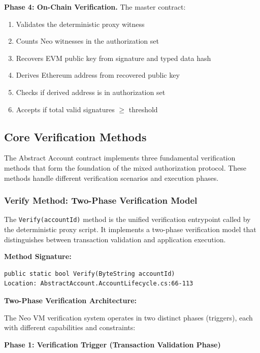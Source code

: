 \documentclass[10pt,twocolumn]{article}
\newcommand{\code}[1]{\texttt{\small #1}}
\begin{document}
{\textbf{Phase 4: On-Chain Verification.} The master contract:
\begin{enumerate}[leftmargin=*,topsep=2pt,itemsep=1pt]
\item Validates the deterministic proxy witness
\item Counts Neo witnesses in the authorization set
\item Recovers EVM public key from signature and typed data hash
\item Derives Ethereum address from recovered public key
\item Checks if derived address is in authorization set
\item Accepts if total valid signatures $\geq$ threshold
\end{enumerate}



\subsection{Core Verification Methods}

The Abstract Account contract implements three fundamental verification methods that form the foundation of the mixed authorization protocol. These methods handle different verification scenarios and execution phases.

\subsubsection{Verify Method: Two-Phase Verification Model}

The \code{Verify(accountId)} method is the unified verification entrypoint called by the deterministic proxy script. It implements a two-phase verification model that distinguishes between transaction validation and application execution.

\textbf{Method Signature:}
\begin{small}
\begin{verbatim}
public static bool Verify(ByteString accountId)
Location: AbstractAccount.AccountLifecycle.cs:66-113
\end{verbatim}
\end{small}

\textbf{Two-Phase Verification Architecture:}

The Neo VM verification system operates in two distinct phases (triggers), each with different capabilities and constraints:

\textbf{Phase 1: Verification Trigger (Transaction Validation Phase)}

}
\end{document}
